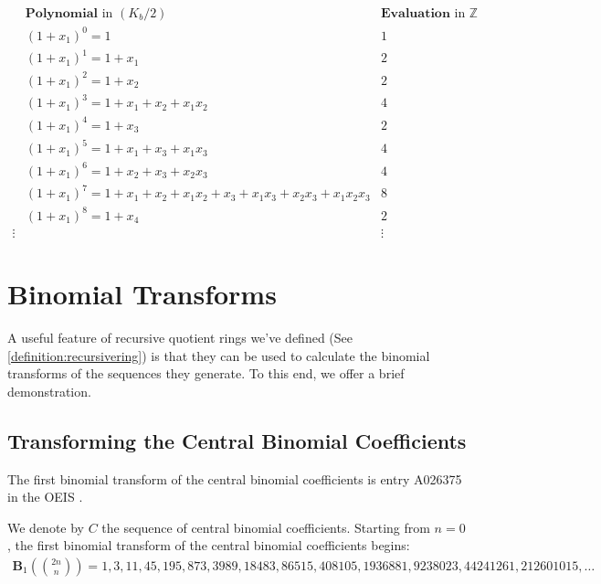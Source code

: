 \documentclass{article}
\theoremstyle{plain}
\theoremstyle{definition}
\newcommand{\Z}{\mathbb{Z}}
\newcommand{\K}{K}
\newcommand{\BT}{\textbf{B}}
\begin{document}
\small
\begin{align*}
& \textbf{Polynomial} \text{ in } (\K_b/2) & \textbf{Evaluation} \text{ in } \Z \\ 
& (1+x_1)^0 = 1 & 1 \\
& (1+x_1)^1 = 1+x_1 & 2 \\
& (1+x_1)^2 = 1+x_2 & 2 \\
& (1+x_1)^3 = 1+x_1+x_2+x_1x_2 & 4 \\
& (1+x_1)^4 = 1+x_3 & 2 \\
& (1+x_1)^5 = 1+x_1+x_3+x_1x_3 & 4 \\
& (1+x_1)^6 = 1+x_2+x_3+x_2x_3 & 4 \\
& (1+x_1)^7 = 1+x_1+x_2+x_1x_2+x_3+x_1x_3+x_2x_3+x_1x_2x_3 & 8 \\
& (1+x_1)^8 = 1+x_4 & 2 \\
\vdots & & \vdots
\end{align*}
\normalsize

\section{Binomial Transforms}
A useful feature of recursive quotient rings we've defined (See \cref{definition:recursivering}) is that they can be used to calculate the binomial transforms of the sequences they generate. To this end, we offer a brief demonstration.

\subsection{Transforming the Central Binomial Coefficients}
The first binomial transform of the central binomial coefficients is entry A026375 in the OEIS \cite{A026375}.

We denote by $C$ the sequence of central binomial coefficients. Starting from $n=0$, the first binomial transform of the central binomial coefficients begins:
\begin{align*}
\BT_{1}\left(\binom{2n}{n}\right) = 1, 3, 11, 45, 195, 873, 3989, 18483, 86515, 408105, 1936881, 9238023, 44241261, 212601015, \ldots
\end{align*}
\end{document}
